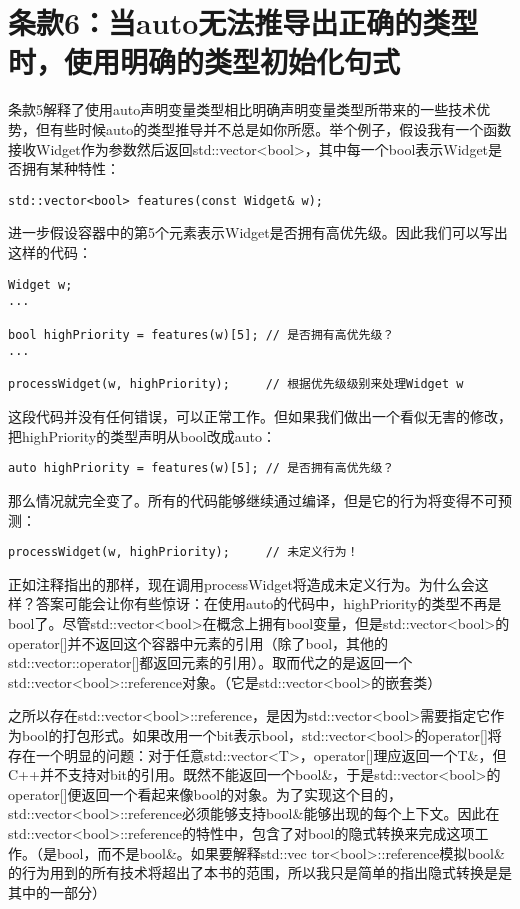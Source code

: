 \section{条款6：当auto无法推导出正确的类型时，使用明确的类型初始化句式}

条款5解释了使用auto声明变量类型相比明确声明变量类型所带来的一些技术优势，但有些时候auto的类型推导并不总是如你所愿。举个例子，假设我有一个函数接收Widget作为参数然后返回std::vector<bool>，其中每一个bool表示Widget是否拥有某种特性：

\begin{lstlisting}
std::vector<bool> features(const Widget& w);
\end{lstlisting}

进一步假设容器中的第5个元素表示Widget是否拥有高优先级。因此我们可以写出这样的代码：

\begin{lstlisting}
Widget w;
...

bool highPriority = features(w)[5]; // 是否拥有高优先级？
...

processWidget(w, highPriority);     // 根据优先级级别来处理Widget w
\end{lstlisting}

这段代码并没有任何错误，可以正常工作。但如果我们做出一个看似无害的修改，把highPriority的类型声明从bool改成auto：

\begin{lstlisting}
auto highPriority = features(w)[5]; // 是否拥有高优先级？
\end{lstlisting}

那么情况就完全变了。所有的代码能够继续通过编译，但是它的行为将变得不可预测：

\begin{lstlisting}
processWidget(w, highPriority);     // 未定义行为！
\end{lstlisting}

正如注释指出的那样，现在调用processWidget将造成未定义行为。为什么会这样？答案可能会让你有些惊讶：在使用auto的代码中，highPriority的类型不再是bool了。尽管std::vector<bool>在概念上拥有bool变量，但是std::vector<bool>的operator[]并不返回这个容器中元素的引用（除了bool，其他的std::vector::operator[]都返回元素的引用）。取而代之的是返回一个std::vector<bool>::reference对象。（它是std::vector<bool>的嵌套类）

之所以存在std::vector<bool>::reference，是因为std::vector<bool>需要指定它作为bool的打包形式。如果改用一个bit表示bool，std::vector<bool>的operator[]将存在一个明显的问题：对于任意std::vector<T>，operator[]理应返回一个T\&，但C++并不支持对bit的引用。既然不能返回一个bool\&，于是std::vector<bool>的operator[]便返回一个看起来像bool的对象。为了实现这个目的，std::vector<bool>::reference必须能够支持bool\&能够出现的每个上下文。因此在std::vector<bool>::reference的特性中，包含了对bool的隐式转换来完成这项工作。（是bool，而不是bool\&。如果要解释std::vec
tor<bool>::reference模拟bool\&的行为用到的所有技术将超出了本书的范围，所以我只是简单的指出隐式转换是是其中的一部分）

